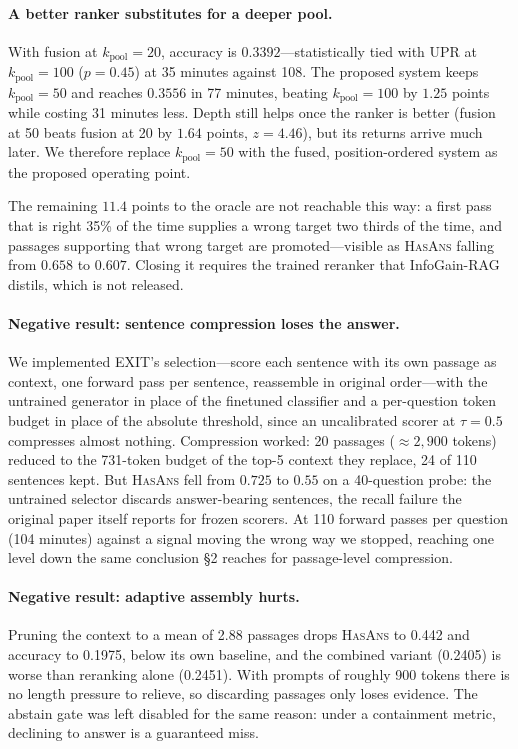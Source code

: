 \documentclass[11pt]{article}
\begin{document}
\paragraph{A better ranker substitutes for a deeper pool.} With fusion at
$k_{\text{pool}}{=}20$, accuracy is $0.3392$---statistically tied with UPR at
$k_{\text{pool}}{=}100$ ($p{=}0.45$) at 35 minutes against 108. The proposed system keeps
$k_{\text{pool}}{=}50$ and reaches $0.3556$ in 77 minutes, beating $k_{\text{pool}}{=}100$ by
$1.25$ points while costing 31 minutes less. Depth still helps once the ranker is better
(fusion at 50 beats fusion at 20 by $1.64$ points, $z{=}4.46$), but its returns arrive much
later. We therefore replace $k_{\text{pool}}{=}50$ with the fused, position-ordered system as
the proposed operating point.

The remaining $11.4$ points to the oracle are not reachable this way: a first pass that is
right 35\% of the time supplies a wrong target two thirds of the time, and passages supporting
that wrong target are promoted---visible as \textsc{HasAns} falling from $0.658$ to $0.607$.
Closing it requires the trained reranker that InfoGain-RAG distils, which is not released.

\paragraph{Negative result: sentence compression loses the answer.}
\label{sec:compression}
We implemented EXIT's selection---score each sentence with its own passage as context, one
forward pass per sentence, reassemble in original order---with the untrained generator in
place of the finetuned classifier and a per-question token budget in place of the absolute
threshold, since an uncalibrated scorer at $\tau{=}0.5$ compresses almost nothing. Compression
worked: 20 passages (${\approx}2{,}900$ tokens) reduced to the 731-token budget of the top-5
context they replace, 24 of 110 sentences kept. But \textsc{HasAns} fell from $0.725$ to
$0.55$ on a 40-question probe: the untrained selector discards answer-bearing sentences, the
recall failure the original paper itself reports for frozen scorers. At 110 forward passes per
question (104 minutes) against a signal moving the wrong way we stopped, reaching one level
down the same conclusion \S2 reaches for passage-level compression.

\paragraph{Negative result: adaptive assembly hurts.} Pruning the context to a mean of 2.88
passages drops \textsc{HasAns} to 0.442 and accuracy to 0.1975, below its own baseline, and
the combined variant (0.2405) is worse than reranking alone (0.2451). With prompts of roughly
900 tokens there is no length pressure to relieve, so discarding passages only loses evidence.
The abstain gate was left disabled for the same reason: under a containment metric, declining
to answer is a guaranteed miss.
\end{document}
